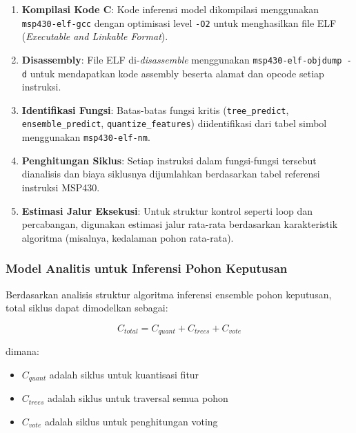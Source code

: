 \begin{enumerate}
    \item \textbf{Kompilasi Kode C}: Kode inferensi model dikompilasi menggunakan \texttt{msp430-elf-gcc} dengan optimisasi level \texttt{-O2} untuk menghasilkan file ELF (\textit{Executable and Linkable Format}).
    
    \item \textbf{Disassembly}: File ELF di-\textit{disassemble} menggunakan \texttt{msp430-elf-objdump -d} untuk mendapatkan kode assembly beserta alamat dan opcode setiap instruksi.
    
    \item \textbf{Identifikasi Fungsi}: Batas-batas fungsi kritis (\texttt{tree\_predict}, \texttt{ensemble\_predict}, \texttt{quantize\_features}) diidentifikasi dari tabel simbol menggunakan \texttt{msp430-elf-nm}.
    
    \item \textbf{Penghitungan Siklus}: Setiap instruksi dalam fungsi-fungsi tersebut dianalisis dan biaya siklusnya dijumlahkan berdasarkan tabel referensi instruksi MSP430.
    
    \item \textbf{Estimasi Jalur Eksekusi}: Untuk struktur kontrol seperti loop dan percabangan, digunakan estimasi jalur rata-rata berdasarkan karakteristik algoritma (misalnya, kedalaman pohon rata-rata).
\end{enumerate}

\subsubsection{Model Analitis untuk Inferensi Pohon Keputusan}

Berdasarkan analisis struktur algoritma inferensi ensemble pohon keputusan, total siklus dapat dimodelkan sebagai:

\begin{equation}
C_{total} = C_{quant} + C_{trees} + C_{vote}
\label{eq:total-cycles}
\end{equation}

\noindent dimana:

\begin{itemize}
    \item $C_{quant}$ adalah siklus untuk kuantisasi fitur
    \item $C_{trees}$ adalah siklus untuk traversal semua pohon
    \item $C_{vote}$ adalah siklus untuk penghitungan voting
\end{itemize}

